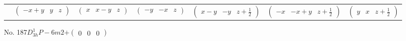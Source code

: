 \documentclass[fleqn,9pt,landscape]{jsarticle}
\begin{document}
\begin{center}
\begin{longtable}{ccccccc}
& $ \begin{pmatrix} - x + y & y & z \end{pmatrix} $ & $ \begin{pmatrix} x & x - y & z \end{pmatrix} $ & $ \begin{pmatrix} - y & - x & z \end{pmatrix} $ & $ \begin{pmatrix} x - y & - y & z + \frac{1}{2} \end{pmatrix} $ & $ \begin{pmatrix} - x & - x + y & z + \frac{1}{2} \end{pmatrix} $ & $ \begin{pmatrix} y & x & z + \frac{1}{2} \end{pmatrix} $ \\
\end{longtable}
\end{center}
\newpage
No. 187\quad$D_{3h}^{1}$\quad$P-6m2$\quad[ hexagonal ]\quad$+\begin{pmatrix} 0 & 0 & 0 \end{pmatrix}$
\end{document}
